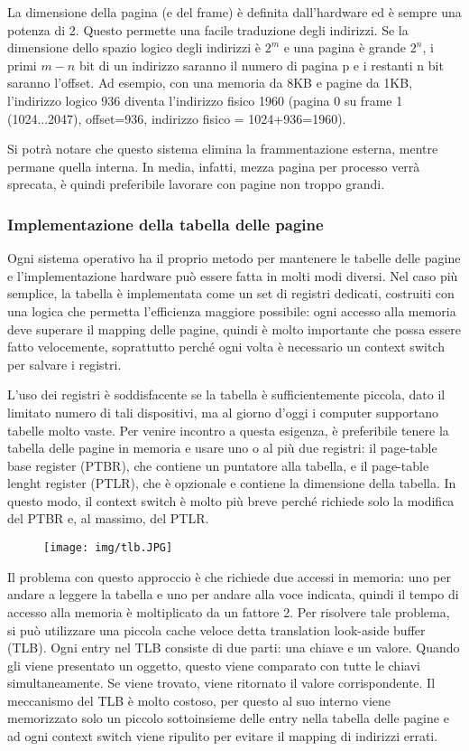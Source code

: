 \documentclass[a4paper]{article}
\begin{document}
La dimensione della pagina (e del frame) è definita dall'hardware ed è sempre una potenza di 2. Questo permette una facile traduzione degli indirizzi. Se la dimensione dello spazio logico degli indirizzi è $2^m$ e una pagina è grande $2^n$, i primi $m-n$ bit di un indirizzo saranno il numero di pagina p e i restanti n bit saranno l'offset. Ad esempio, con una memoria da 8KB e pagine da 1KB, l'indirizzo logico 936 diventa l'indirizzo fisico 1960 (pagina 0 su frame 1 (1024...2047), offset=936, indirizzo fisico = 1024+936=1960).

Si potrà notare che questo sistema elimina la frammentazione esterna, mentre permane quella interna. In media, infatti, mezza pagina per processo verrà sprecata, è quindi preferibile lavorare con pagine non troppo grandi.

\subsubsection{Implementazione della tabella delle pagine}
Ogni sistema operativo ha il proprio metodo per mantenere le tabelle delle pagine e l'implementazione hardware può essere fatta in molti modi diversi. Nel caso più semplice, la tabella è implementata come un set di registri dedicati, costruiti con una logica che permetta l'efficienza maggiore possibile: ogni accesso alla memoria deve superare il mapping delle pagine, quindi è molto importante che possa essere fatto velocemente, soprattutto perché ogni volta è necessario un context switch per salvare i registri.

L'uso dei registri è soddisfacente se la tabella è sufficientemente piccola, dato il limitato numero di tali dispositivi, ma al giorno d'oggi i computer supportano tabelle molto vaste. Per venire incontro a questa esigenza, è preferibile tenere la tabella delle pagine in memoria e usare uno o al più due registri: il page-table base register (PTBR), che contiene un puntatore alla tabella, e il page-table lenght register (PTLR), che è opzionale e contiene la dimensione della tabella. In questo modo, il context switch è molto più breve perché richiede solo la modifica del PTBR e, al massimo, del PTLR.

\begin{figure}[h!]
    \centering
    \texttt{[image: img/tlb.JPG]}
\end{figure}

Il problema con questo approccio è che richiede due accessi in memoria: uno per andare a leggere la tabella e uno per andare alla voce indicata, quindi il tempo di accesso alla memoria è moltiplicato da un fattore 2. Per risolvere tale problema, si può utilizzare una piccola cache veloce detta translation look-aside buffer (TLB). Ogni entry nel TLB consiste di due parti: una chiave e un valore.  Quando gli viene presentato un oggetto, questo viene comparato con tutte le chiavi simultaneamente. Se viene trovato, viene ritornato il valore corrispondente.
Il meccanismo del TLB è molto costoso, per questo al suo interno viene memorizzato solo un piccolo sottoinsieme delle entry nella tabella delle pagine e ad ogni context switch viene ripulito per evitare il mapping di indirizzi errati.
\end{document}
